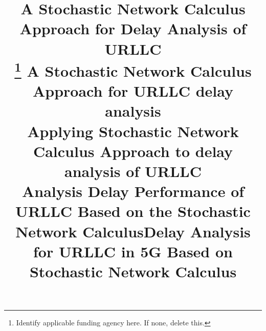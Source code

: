 \documentclass[conference]{IEEEtran}
\begin{document}
\title{A Stochastic Network Calculus Approach for Delay Analysis of URLLC\\
\thanks{Identify applicable funding agency here. If none, delete this.}
}
\title{A Stochastic Network Calculus Approach for URLLC delay analysis\\}
\title{Applying Stochastic Network Calculus Approach to delay analysis of URLLC \\}
\title{Analysis Delay Performance of URLLC Based on the Stochastic Network Calculus}
\title{Delay Analysis for URLLC in 5G Based on Stochastic Network Calculus\\}

\author{
}

\maketitle
\end{document}
